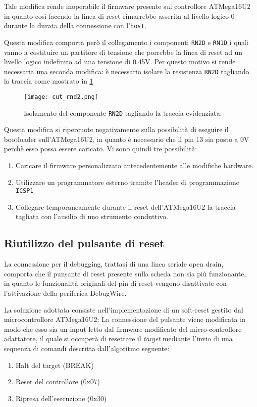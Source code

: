 Tale modifica rende inoperabile il firmware presente sul controllore ATMega16U2 in quanto così facendo la linea di reset rimarrebbe asserita al livello logico 0 durante la durata della connessione con l'\texttt{host}.

Questa modifica comporta però il collegamento i componenti \texttt{RN2D} e \texttt{RN1D} i quali vanno a costituire un partitore di tensione che porrebbe la linea di reset ad un livello logico indefinito ad una tensione di 0.45V. Per questo motivo si rende necessaria una seconda modifica: è necessario isolare la resistenza \texttt{RN2D} tagliando la traccia come mostrato in \cref{fig:cut-rnd2}

\begin{figure}[b]
    \centering
    \texttt{[image: cut\_rnd2.png]}
    \caption[]{Isolamento del componente \texttt{RN2D} tagliando la traccia evidenziata.}\label{fig:cut-rnd2}
\end{figure}

Questa modifica si ripercuote negativamente sulla possibilità di eseguire il bootloader sull'ATMega16U2, in quanto è necessario che il pin 13 sia posto a 0V perchè esso possa essere caricato. Vi sono quindi tre possibilità:
\begin{enumerate}
    \item Caricare il firmware personalizzato antecedentemente alle modifiche hardware.
    \item Utilizzare un programmatore esterno tramite l'header di programmazione \texttt{ICSP1}
    \item Collegare temporaneamente durante il reset dell'ATMega16U2 la traccia tagliata con l'ausilio di uno strumento conduttivo.
\end{enumerate} 

\subsection{Riutilizzo del pulsante di reset}

La connessione per il debugging, trattasi di una linea seriale open drain, comporta che il punsante di reset presente sulla scheda non sia più funzionante, in quanto le funzionalità originali del pin di reset vengono disattivate con l'attivazione della periferica DebugWire.

La soluzione adottata consiste nell'implementazione di un soft-reset gestito dal microcontrollore ATMega16U2: La connessione del pulsante viene modificata in modo che esso sia un input letto dal firmware modificato del micro-controllore adattatore, il quale si occuperà di resettare il \textit{target} mediante l'invio di una sequenza di comandi descritta dall'algoritmo seguente:
\begin{enumerate}
    \item Halt del target (BREAK)
    \item Reset del controllore (0x07)
    \item Ripresa dell'esecuzione (0x30)
\end{enumerate}

